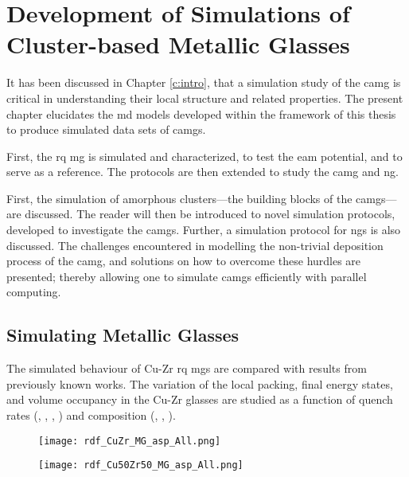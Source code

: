 \chapter{Development of Simulations of Cluster-based Metallic Glasses} \label{c:dev}
\scdeclaration

It has been discussed in Chapter \ref{c:intro}, that a simulation study of the \gls{camg} is critical in understanding their local structure and related properties. %
The present chapter elucidates the \gls{md} models developed within the framework of this thesis to produce simulated data sets of \gls{camg}s. \par

First, the \Gls{rq} \gls{mg} is simulated and characterized, to test the \gls{eam} potential, and to serve as a reference. The protocols are then extended to study the \gls{camg} and \gls{ng}. \par First, the simulation of amorphous clusters---the building blocks of the \gls{camg}s---are discussed. The reader will then be introduced to novel simulation protocols, developed to investigate the \gls{camg}s. Further, a simulation protocol for \gls{ng}s is also discussed.  The challenges encountered in modelling the non-trivial deposition process of the \gls{camg}, and solutions on how to overcome these hurdles are presented; thereby allowing one to simulate \gls{camg}s efficiently with parallel computing. %

\section{Simulating Metallic Glasses} \label{s:simtestMG}
The simulated behaviour of Cu-Zr \gls{rq} \gls{mg}s are compared with results from previously known works. The variation of the local packing, final energy states, and volume occupancy in the Cu-Zr glasses are studied as a function of quench rates (, , , ) and composition (\cz, \czsix, \czsf). \par

\begin{sidewaysfigure} %
	\centering
	\begin{subfigure}{\textheight} \centering \texttt{[image: rdf\_CuZr\_MG\_asp\_All.png]}
		 \end{subfigure}%
	\vfill
	\begin{subfigure}{\textheight} \centering \texttt{[image: rdf\_Cu50Zr50\_MG\_asp\_All.png]}
		 \end{subfigure}
	\label{f:rdf_mgs}
\end{sidewaysfigure}

